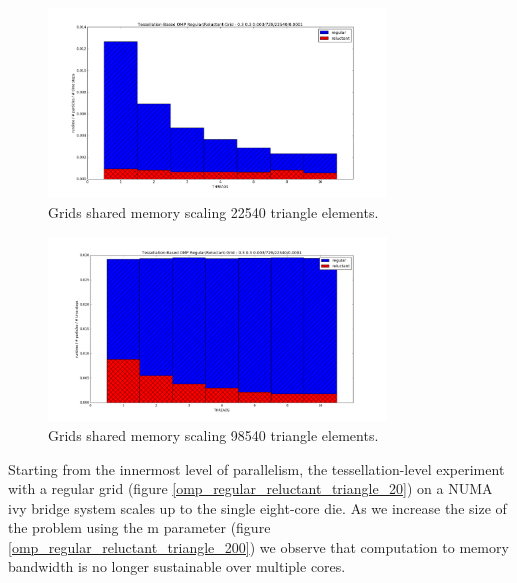 \begin{figure}[htb]
  \begin{center}
    \includegraphics[width=0.8\textwidth]{experiments/omp/omp_mesh_regular-reluctant_20.png}
  \end{center}
  \caption{Grids shared memory scaling 22540 triangle elements.}
  \label{figure:omp_regular_reluctant_triangle_20}
\end{figure}

\begin{figure}[htb]
  \begin{center}
    \includegraphics[width=0.8\textwidth]{experiments/omp/omp_mesh_regular-reluctant_200.png}
  \end{center}
  \caption{Grids shared memory scaling 98540 triangle elements.}
  \label{figure:omp_regular_reluctant_triangle_200}
\end{figure}



Starting from the innermost level of parallelism, the tessellation-level experiment with a regular grid (figure \ref{omp_regular_reluctant_triangle_20}) on a NUMA ivy bridge system scales up to the single eight-core die. As we increase the size of the problem using the m parameter (figure \ref{omp_regular_reluctant_triangle_200}) we observe that computation to memory bandwidth is no longer sustainable over multiple cores. 

